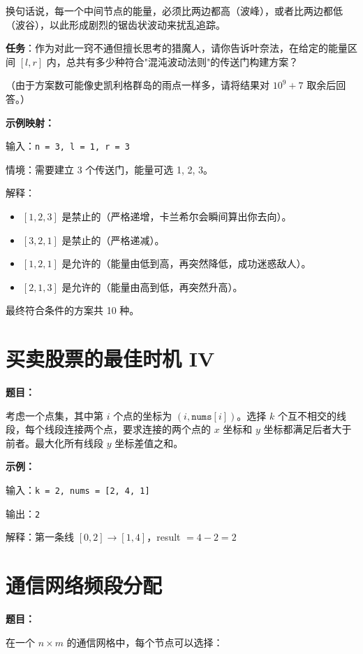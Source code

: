 \documentclass[12pt, a4paper]{article}
\begin{document}
换句话说，每一个中间节点的能量，必须比两边都高（波峰），或者比两边都低（波谷），以此形成剧烈的锯齿状波动来扰乱追踪。

\textbf{任务}：作为对此一窍不通但擅长思考的猎魔人，请你告诉叶奈法，在给定的能量区间 $[l, r]$ 内，总共有多少种符合"混沌波动法则"的传送门构建方案？

（由于方案数可能像史凯利格群岛的雨点一样多，请将结果对 $10^9 + 7$ 取余后回答。）

\textbf{示例映射：}

输入：\texttt{n = 3, l = 1, r = 3}

情境：需要建立 3 个传送门，能量可选 1, 2, 3。

解释：
\begin{itemize}[leftmargin=2em]
  \item $[1, 2, 3]$ 是禁止的（严格递增，卡兰希尔会瞬间算出你去向）。
  \item $[3, 2, 1]$ 是禁止的（严格递减）。
  \item $[1, 2, 1]$ 是允许的（能量由低到高，再突然降低，成功迷惑敌人）。
  \item $[2, 1, 3]$ 是允许的（能量由高到低，再突然升高）。
\end{itemize}

最终符合条件的方案共 10 种。



\section{买卖股票的最佳时机 IV}

\noindent\textbf{题目：}

考虑一个点集，其中第 $i$ 个点的坐标为 $(i, \texttt{nums}[i])$。选择 $k$ 个互不相交的线段，每个线段连接两个点，要求连接的两个点的 $x$ 坐标和 $y$ 坐标都满足后者大于前者。最大化所有线段 $y$ 坐标差值之和。

\textbf{示例：}

输入：\texttt{k = 2, nums = [2, 4, 1]}

输出：\texttt{2}

解释：第一条线 $[0,2] \to [1,4]$，result $= 4 - 2 = 2$



\section{通信网络频段分配}

\noindent\textbf{题目：}

在一个 $n \times m$ 的通信网格中，每个节点可以选择：
\end{document}
